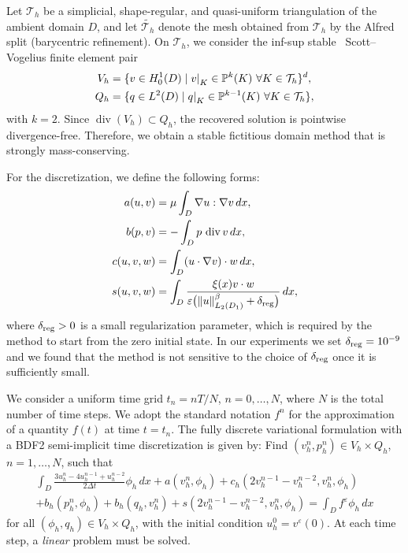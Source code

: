 \documentclass[11pt]{article}
\begin{document}
\newcommand{\Tht}{\mathcal{T}_h}
\newcommand{\restr}[2]{{\left.\kern-\nulldelimiterspace#1\right|_{#2}}}
\newcommand{\diver}{\operatorname{div}}	

Let $\Tht$ be a simplicial, shape-regular, and quasi-uniform triangulation of the ambient domain $D$, and let $\widetilde{\Tht}$ denote the mesh obtained from $\Tht$ by the Alfred split (barycentric refinement).  
On $\Tht$, we consider the inf-sup stable~\cite{arnold1992quadratic} Scott--Vogelius finite element pair
\begin{align*}
	V_h &= \{v\in H^1_0(D) \mid \restr{v}{K}\in\mathbb{P}^k(K)~\forall K\in\Tht  \}^d,\\
	Q_h &= \{q\in L^2(D) \mid \restr{q}{K}\in\mathbb{P}^{k-1}(K)~\forall K\in\Tht  \},
\end{align*}
with $k=2$. Since $\operatorname{div}(V_h)\subset Q_h$, the recovered solution is pointwise divergence-free. Therefore, we obtain a stable fictitious domain method that is strongly mass-conserving.  

For the discretization, we define the following forms:
\begin{align*}
	a(u, v) &= \mu \int_{D}\nabla u :\nabla v \,dx,\\
	b(p, v) &=  -\int_{D} p\, \diver v\,dx,\\
	c(u, v, w) &= \int_{D} (u\cdot\nabla v)\cdot w\,dx,\\
	s(u, v, w) &= \int_{D} \frac{\xi(x)v\cdot w}{\varepsilon\big(\|u\|_{L_2(D_1)}^{\beta}+{\delta_{\rm reg}}\big)} \,dx,
\end{align*}
where {$\delta_{\rm reg}>0$} is a small regularization parameter, {which is required by the method to start from the zero initial state}.  {In our experiments we set $\delta_{\rm reg}=10^{-9}$ and we found that the method is not sensitive to the  choice of $\delta_{\rm reg}$ once it is sufficiently small.}

We consider a uniform time grid $t_n = nT/N$, $n = 0,\dots,N$, where $N$ is the total number of time steps. We adopt the standard notation $f^n$ for the approximation of a quantity $f(t)$ at time $t=t_n$.  
The fully discrete variational formulation with a BDF2 semi-implicit time discretization is given by:  
Find $(v_h^n, p_h^n)\in V_h\times Q_h$, $n=1,\dots,N$, such that
\begin{multline}\label{eqn.discrete.method:TH}
	\int_{D}\frac{3 u^n_h - 4u_h^{n-1} + u_h^{n-2}}{2 \Delta t}  \phi_h \,dx 
	+ a( v^n_h, \phi_h) 
	+ c_h(2v^{n-1}_h - v^{n-2}_h,  v^n_h,  \phi_h)\\ 
	+ b_h(p_h^n,  \phi_h) + b_h(q_h, v^n_h)
	+ s(2v^{n-1}_h - v^{n-2}_h, v^n_h, \phi_h)  = \int_{D}f^\varepsilon  \phi_h \,dx
\end{multline}
for all $(\phi_h, q_h)\in V_h\times Q_h$, with the initial condition $u^0_h = v^\varepsilon(0)$.  
At each time step, a \textit{linear} problem must be solved.
\end{document}
